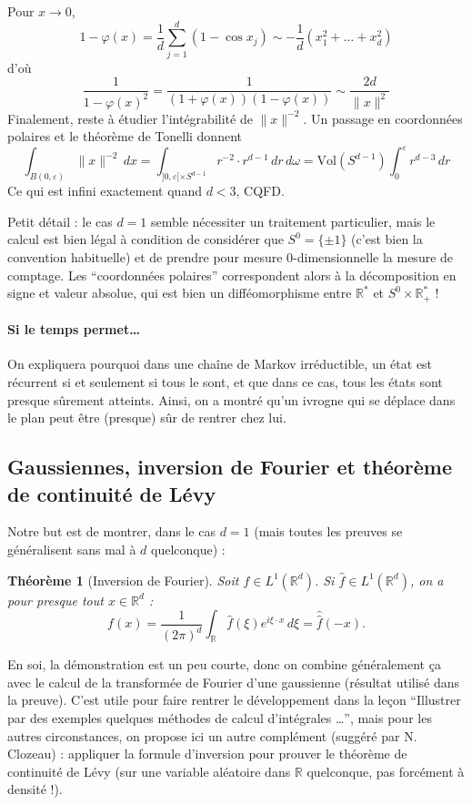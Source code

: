 \documentclass[a4paper, 11pt]{article}
\def\R{\mathbb{R}}
\def\Vol{\mathrm{Vol}}
\newtheorem*{theorem}{Théorème}
\begin{document}
Pour $x \to 0$,
\[ 1 - \varphi(x) = \frac{1}{d} \sum_{j=1}^d (1 - \cos x_j) \sim
  -\frac{1}{d}(x_1^2 + \ldots + x_d^2) \] d'où
\[\frac{1}{1 - \varphi(x)^2} = \frac{1}{(1 + \varphi(x))(1 - \varphi(x))} \sim
  \frac{2d}{\|x\|^2} \]
Finalement, reste à étudier l'intégrabilité de $\|x\|^{-2}$. Un passage en
coordonnées polaires et le théorème de Tonelli donnent
\[ \int_{B(0,\varepsilon)} \|x\|^{-2}\,dx = \int_{]0,\varepsilon[ \times S^{d-1}}
  r^{-2} \cdot r^{d-1}\,dr\,d\omega = \Vol(S^{d-1}) \int_0^\varepsilon
  r^{d-3}\,dr \]
Ce qui est infini exactement quand $d < 3$, CQFD.

Petit détail : le cas $d=1$ semble nécessiter un traitement particulier,
mais le calcul est bien légal à condition de considérer que $S^0 = \{\pm 1\}$
(c'est bien la convention habituelle) et de prendre pour mesure 0-dimensionnelle
la mesure de comptage. Les \enquote{coordonnées polaires} correspondent alors à
la décomposition en signe et valeur absolue, qui est bien un
difféomorphisme entre $\R^*$ et $S^0 \times \R_+^*$ !

\paragraph{Si le temps permet…} On expliquera pourquoi dans une chaîne de Markov
irréductible, un état est récurrent si et seulement si tous le sont, et que dans
ce cas, tous les états sont presque sûrement atteints. Ainsi, on a montré qu'un
ivrogne qui se déplace dans le plan peut être (presque) sûr de rentrer chez lui.

\newpage

\subsection{Gaussiennes, inversion de Fourier et théorème de continuité de Lévy}

Notre but est de montrer, dans le cas $d = 1$ (mais toutes les preuves se
généralisent sans mal à $d$ quelconque) :

\begin{theorem}[Inversion de Fourier]
  Soit $f \in L^1(\R^d)$. Si $\hat{f} \in L^1(\R^d)$, on a pour presque
  tout $x \in \R^d$ :
\[ f(x) = \frac{1}{(2\pi)^d} \int_\R \hat{f}(\xi) e^{i\xi \cdot x} \,d\xi =
  \hat{\hat{f}}(-x). \]
\end{theorem}

En soi, la démonstration est un peu courte, donc on combine généralement ça avec
le calcul de la transformée de Fourier d'une gaussienne (résultat utilisé dans
la preuve). C'est utile pour faire rentrer le développement dans la leçon
\enquote{Illustrer par des exemples quelques méthodes de calcul d'intégrales …},
mais pour les autres circonstances, on propose ici un autre complément (suggéré
par N. Clozeau) : appliquer la formule d'inversion pour prouver le théorème de
continuité de Lévy (sur une variable aléatoire dans $\R$ quelconque, pas
forcément à densité !).
\end{document}
